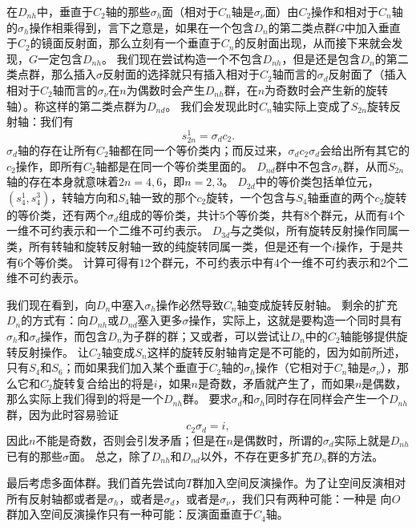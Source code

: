 在$D_{nh}$中，垂直于$C_2$轴的那些$\sigma_h$面（相对于$C_n$轴是$\sigma_\nu$面）由$C_2$操作和相对于$C_n$轴的$\sigma_h$操作相乘得到，言下之意是，如果在一个包含$D_n$的第二类点群$G$中加入垂直于$C_2$的镜面反射面，那么立刻有一个垂直于$C_n$的反射面出现，从而接下来就会发现，$G$一定包含$D_{nh}$。
我们现在尝试构造一个不包含$D_{nh}$，但是还是包含$D_{n}$的第二类点群，那么插入$\sigma$反射面的选择就只有插入相对于$C_2$轴而言的$\sigma_d$反射面了（插入相对于$C_2$轴而言的$\sigma_\nu$在$n$为偶数时会产生$D_{nh}$群，在$n$为奇数时会产生新的旋转轴）。称这样的第二类点群为$D_{nd}$。
我们会发现此时$C_n$轴实际上变成了$S_{2n}$旋转反射轴：我们有
\begin{equation}
    s_{2n}^1 = \sigma_d c_2. 
    \label{eq:from-sigma-d-c-2-to-s-2n}
\end{equation}
$\sigma_d$轴的存在让所有$C_2$轴都在同一个等价类内；而反过来，$\sigma_d c_2 \sigma_d$会给出所有其它的$c_2$操作，即所有$C_2$轴都是在同一个等价类里面的。
$D_{nd}$群中不包含$\sigma_h$群，从而$S_{2n}$轴的存在本身就意味着$2n=4, 6$，即$n=2, 3$。
$D_{2d}$中的等价类包括单位元，$(s_4^1, s_4^3)$，转轴方向和$S_4$轴一致的那个$c_2$旋转，一个包含与$S_4$轴垂直的两个$c_2$旋转的等价类，还有两个$\sigma_d$组成的等价类，共计$5$个等价类，共有$8$个群元，从而有$4$个一维不可约表示和一个二维不可约表示。
$D_{3d}$与之类似，所有旋转反射操作同属一类，所有转轴和旋转反射轴一致的纯旋转同属一类，但是还有一个$i$操作，于是共有$6$个等价类。
计算可得有$12$个群元，不可约表示中有$4$个一维不可约表示和$2$个二维不可约表示。

我们现在看到，向$D_n$中塞入$\sigma_h$操作必然导致$C_n$轴变成旋转反射轴。
剩余的扩充$D_n$的方式有：向$D_{nh}$或$D_{nd}$塞入更多$\sigma$操作，实际上，这就是要构造一个同时具有$\sigma_h$和$\sigma_d$操作，而包含$D_{n}$为子群的群；又或者，可以尝试让$D_n$中的$C_2$轴能够提供旋转反射操作。
让$C_2$轴变成$S_n$这样的旋转反射轴肯定是不可能的，因为如前所述，只有$S_4$和$S_6$；而如果我们加入某个垂直于$C_2$轴的$\sigma_h$操作（它相对于$C_n$轴是$\sigma_\nu$），那么它和$C_2$旋转复合给出的将是$i$，如果$n$是奇数，矛盾就产生了，而如果$n$是偶数，那么实际上我们得到的将是一个$D_{nh}$群。
要求$\sigma_d$和$\sigma_h$同时存在同样会产生一个$D_{nh}$群，因为此时容易验证
\begin{equation}
    c_2 \sigma_d = i,
\end{equation}
因此$n$不能是奇数，否则会引发矛盾；但是在$n$是偶数时，所谓的$\sigma_d$实际上就是$D_{nh}$已有的那些$\sigma$面。
总之，除了$D_{nh}$和$D_{nd}$以外，不存在更多扩充$D_n$群的方法。

最后考虑多面体群。我们首先尝试向$T$群加入空间反演操作。为了让空间反演相对所有反射轴都或者是$\sigma_h$，或者是$\sigma_d$，或者是$\sigma_\nu$，我们只有两种可能：一种是
向$O$群加入空间反演操作只有一种可能：反演面垂直于$C_4$轴。

